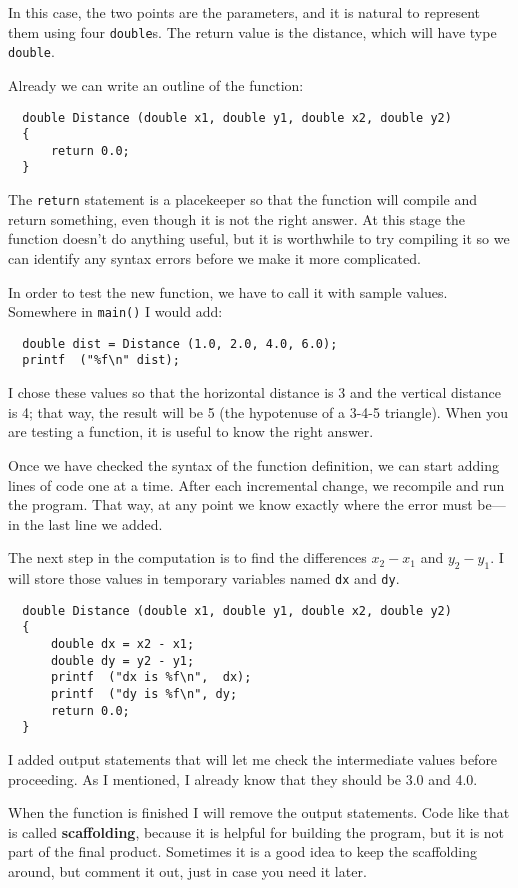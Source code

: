 In this case, the two points are the parameters, and it is natural to
represent them using four {\tt double}s.  The return value is the
distance, which will have type {\tt double}.

Already we can write an outline of the function:

\begin{verbatim}
  double Distance (double x1, double y1, double x2, double y2) 
  {
      return 0.0;
  }
\end{verbatim}
%
The {\tt return} statement is a placekeeper so that the function will
compile and return something, even though it is not the right answer.
At this stage the function doesn't do anything useful, but it is
worthwhile to try compiling it so we can identify any syntax errors
before we make it more complicated.

In order to test the new function, we have to call it with
sample values.  Somewhere in {\tt main()} I would add:

\begin{verbatim}
  double dist = Distance (1.0, 2.0, 4.0, 6.0);
  printf  ("%f\n" dist);
\end{verbatim}
%
I chose these values so that the horizontal
distance is 3 and the vertical distance is 4; that way,
the result will be 5 (the hypotenuse of a 3-4-5 triangle).
When you are testing a function, it is useful to know the right
answer.

Once we have checked the syntax of the function definition, we
can start adding lines of code one at a time.  After each
incremental change, we recompile and run the program.  That
way, at any point we know exactly where the error must be---in
the last line we added.

The next step in the computation is to find the differences
$x_2 - x_1$ and $y_2 - y_1$.  I will store those values in
temporary variables named {\tt dx} and {\tt dy}.

\begin{verbatim}
  double Distance (double x1, double y1, double x2, double y2) 
  {
      double dx = x2 - x1;
      double dy = y2 - y1;
      printf  ("dx is %f\n",  dx);
      printf  ("dy is %f\n", dy;
      return 0.0;
  }
\end{verbatim}
%
I added output statements that will let me check the intermediate
values before proceeding.  As I mentioned, I already know that they
should be 3.0 and 4.0.


When the function is finished I will remove the output statements.  Code
like that is called {\bf scaffolding}, because it is helpful for
building the program, but it is not part of the final product.
Sometimes it is a good idea to keep the scaffolding around, but
comment it out, just in case you need it later.

